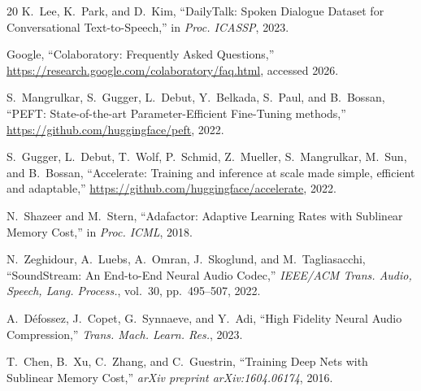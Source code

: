 \documentclass[conference]{IEEEtran}
\begin{document}
\begin{thebibliography}{20}
K.~Lee, K.~Park, and D.~Kim, ``DailyTalk: Spoken Dialogue Dataset for Conversational Text-to-Speech,'' in \emph{Proc. ICASSP}, 2023.

Google, ``Colaboratory: Frequently Asked Questions,'' \url{https://research.google.com/colaboratory/faq.html}, accessed 2026.

S.~Mangrulkar, S.~Gugger, L.~Debut, Y.~Belkada, S.~Paul, and B.~Bossan, ``PEFT: State-of-the-art Parameter-Efficient Fine-Tuning methods,'' \url{https://github.com/huggingface/peft}, 2022.

S.~Gugger, L.~Debut, T.~Wolf, P.~Schmid, Z.~Mueller, S.~Mangrulkar, M.~Sun, and B.~Bossan, ``Accelerate: Training and inference at scale made simple, efficient and adaptable,'' \url{https://github.com/huggingface/accelerate}, 2022.

N.~Shazeer and M.~Stern, ``Adafactor: Adaptive Learning Rates with Sublinear Memory Cost,'' in \emph{Proc. ICML}, 2018.

N.~Zeghidour, A.~Luebs, A.~Omran, J.~Skoglund, and M.~Tagliasacchi, ``SoundStream: An End-to-End Neural Audio Codec,'' \emph{IEEE/ACM Trans. Audio, Speech, Lang. Process.}, vol.~30, pp.~495--507, 2022.

A.~D\'efossez, J.~Copet, G.~Synnaeve, and Y.~Adi, ``High Fidelity Neural Audio Compression,'' \emph{Trans. Mach. Learn. Res.}, 2023.

T.~Chen, B.~Xu, C.~Zhang, and C.~Guestrin, ``Training Deep Nets with Sublinear Memory Cost,'' \emph{arXiv preprint arXiv:1604.06174}, 2016.

\end{thebibliography}
\end{document}
